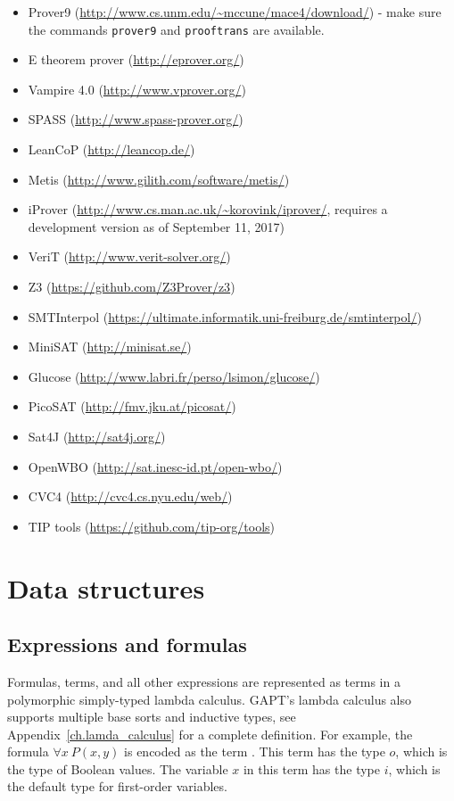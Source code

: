 \documentclass[a4paper,11pt]{book}
\newcommand{\cli}[1]{{\ttfamily {#1}}}
\begin{document}
\begin{itemize}
\item Prover9 (\url{http://www.cs.unm.edu/~mccune/mace4/download/}) - make sure
  the commands \texttt{prover9} and \texttt{prooftrans} are available.
\item E theorem prover (\url{http://eprover.org/})
\item Vampire 4.0 (\url{http://www.vprover.org/})
\item SPASS (\url{http://www.spass-prover.org/})
\item LeanCoP (\url{http://leancop.de/})
\item Metis (\url{http://www.gilith.com/software/metis/})
\item iProver (\url{http://www.cs.man.ac.uk/~korovink/iprover/}, requires
  a development version as of September 11, 2017)
\item VeriT (\url{http://www.verit-solver.org/})
\item Z3 (\url{https://github.com/Z3Prover/z3})
\item SMTInterpol (\url{https://ultimate.informatik.uni-freiburg.de/smtinterpol/})
\item MiniSAT (\url{http://minisat.se/})
\item Glucose (\url{http://www.labri.fr/perso/lsimon/glucose/})
\item PicoSAT (\url{http://fmv.jku.at/picosat/})
\item Sat4J (\url{http://sat4j.org/})
\item OpenWBO (\url{http://sat.inesc-id.pt/open-wbo/})
\item CVC4 (\url{http://cvc4.cs.nyu.edu/web/})
\item TIP tools (\url{https://github.com/tip-org/tools})
\end{itemize}

\chapter{Data structures}

\section{Expressions and formulas}

Formulas, terms, and all other expressions are represented as terms in a
polymorphic simply-typed lambda calculus. GAPT's lambda calculus also supports
multiple base sorts and inductive types, see Appendix~\ref{ch.lamda_calculus}
for a complete definition. For example, the formula $\forall
x\: P(x, y)$ is encoded as the term \cli{'$\forall$' ($\lambda$x (P x) y)}.
This term has the type $o$, which is the type of Boolean values.  The variable
$x$ in this term has the type $i$, which is the default type for first-order
variables.
\end{document}
